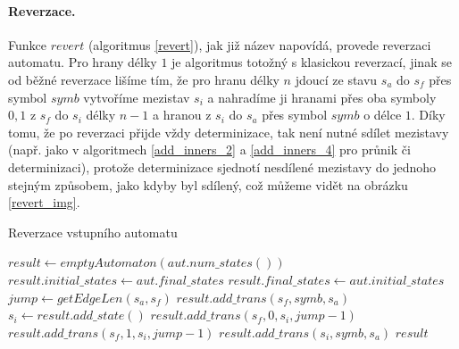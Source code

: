 \paragraph{Reverzace.} Funkce $revert$ (algoritmus \ref{revert}), jak již název napovídá, provede reverzaci automatu. Pro hrany délky $1$ je algoritmus totožný s klasickou reverzací, jinak se od běžné reverzace lišíme tím, že pro hranu délky $n$ jdoucí ze stavu $s_a$ do $s_f$ přes symbol $symb$ vytvoříme mezistav $s_i$ a nahradíme ji hranami přes oba symboly $0,1$ z $s_f$ do $s_i$ délky $n-1$ a hranou z $s_i$ do $s_a$ přes symbol $symb$ o délce $1$. Díky tomu, že po reverzaci přijde vždy determinizace, tak není nutné sdílet mezistavy (např. jako v algoritmech \ref{add_inners_2} a \ref{add_inners_4} pro průnik či determinizaci), protože determinizace sjednotí nesdílené mezistavy do jednoho stejným způsobem, jako kdyby byl sdílený, což můžeme vidět na obrázku \ref{revert_img}.

\begin{algorithm} %
    \caption{Reverzace vstupního automatu}
    \label{revert}
        \begin{algorithmic}[1]
                \State $result \gets emptyAutomaton(aut.num\_states())$
                \State $result.initial\_states \gets aut.final\_states$
                \State $result.final\_states \gets aut.initial\_states$
                        \State $jump \gets getEdgeLen(s_a,s_f)$
                            \State $result.add\_trans(s_f,symb,s_a)$
                        \Else
                            \State $s_i \gets result.add\_state()$
                            \State $result.add\_trans(s_f,0,s_i,jump-1)$
                            \State $result.add\_trans(s_f,1,s_i,jump-1)$
                            \State $result.add\_trans(s_i,symb,s_a)$
                        \EndIf
                    \EndFor
                \EndFor
                \State \Return $result$
            \EndProcedure
        \end{algorithmic}
\end{algorithm}

